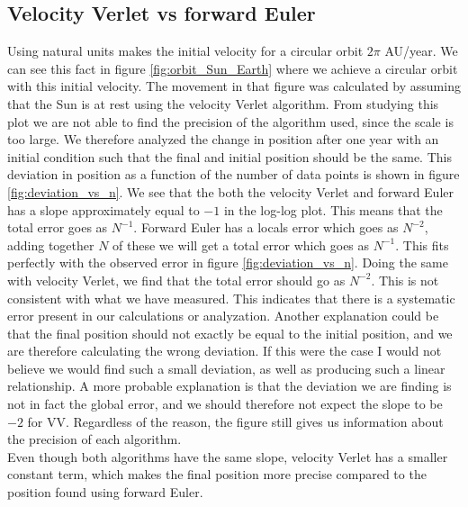 \documentclass[%
 reprint,
nofootinbib,
aps,
]{revtex4-1}
\begin{document}
\subsection{Velocity Verlet vs forward Euler}
Using natural units makes the initial velocity for a circular orbit $2\pi$ AU/year. We can see this fact in figure \vref{fig:orbit_Sun_Earth} where we achieve a circular orbit with this initial velocity. The movement in that figure was calculated by assuming that the Sun is at rest using the velocity Verlet algorithm. From studying this plot we are not able to find the precision of the algorithm used, since the scale is too large. We therefore analyzed the change in position after one year with an initial condition such that the final and initial position should be the same. This deviation in position as a function of the number of data points is shown in figure \vref{fig:deviation_vs_n}. We see that the both the velocity Verlet and forward Euler has a slope approximately equal to $-1$ in the log-log plot. This means that the total error goes as $N^{-1}$. Forward Euler has a locals error which goes as $N^{-2}$, adding together $N$ of these we will get a total error which goes as $N^{-1}$.
This fits perfectly with the observed error in figure \vref{fig:deviation_vs_n}. Doing the same with velocity Verlet, we find that the total error should go as $N^{-2}$. This is not consistent with what we have measured. This indicates that there is a systematic error present in our calculations or analyzation. Another explanation could be that the final position should not exactly be equal to the initial position, and we are therefore calculating the wrong deviation. If this were the case I would not believe we would find such a small deviation, as well as producing such a linear relationship. A more probable explanation is that the deviation we are finding is not in fact the global error, and we should therefore not expect the slope to be $-2$ for VV. Regardless of the reason, the figure still gives us information about the precision of each algorithm.
\\Even though both algorithms have the same slope, velocity Verlet has a smaller constant term, which makes the final position more precise compared to the position found using forward Euler.\\
\end{document}
